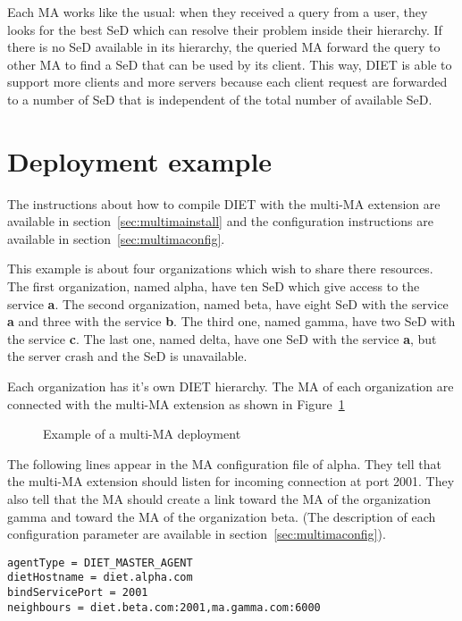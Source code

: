 Each MA works like the usual: when they received a query from a user, they
looks for the best SeD which can resolve their problem inside their
hierarchy. If there is no SeD available in its hierarchy, the queried MA forward
the query to other MA to find a SeD that can be used by its client.  This
way, DIET is able to support more clients and more servers because each client
request are forwarded to a number of SeD that is independent of the total
number of available SeD.

\section{Deployment example}

The instructions about how to compile DIET with the multi-MA extension are
available in section~\ref{sec:multimainstall} and the configuration
instructions are available in section~\ref{sec:multimaconfig}.

This example is about four organizations which wish to share there
resources. The first organization, named alpha, have ten SeD which give access
to the service \textbf{a}. The second organization, named beta, have eight SeD
with the service \textbf{a} and three with the service \textbf{b}. The third
one, named gamma, have two SeD with the service \textbf{c}.  The last one,
named delta, have one SeD with the service \textbf{a}, but the server crash and
the SeD is unavailable.

Each organization has it's own DIET hierarchy. The MA of each organization are
connected with the multi-MA extension as shown in Figure~\ref{fig:multima}


\begin{figure}[h]
 \begin{center}
   \label{fig:multima}
  \caption{Example of a multi-MA deployment}
 \end{center}
\end{figure}

The following lines appear in the MA configuration file of alpha. They tell
that the multi-MA extension should listen for incoming connection at port
2001. They also tell that the MA should create a link toward the MA of the
organization gamma and toward the MA of the organization beta. (The description
of each configuration parameter are available in
section~\ref{sec:multimaconfig}).

\begin{verbatim}
agentType = DIET_MASTER_AGENT
dietHostname = diet.alpha.com
bindServicePort = 2001
neighbours = diet.beta.com:2001,ma.gamma.com:6000
\end{verbatim}

